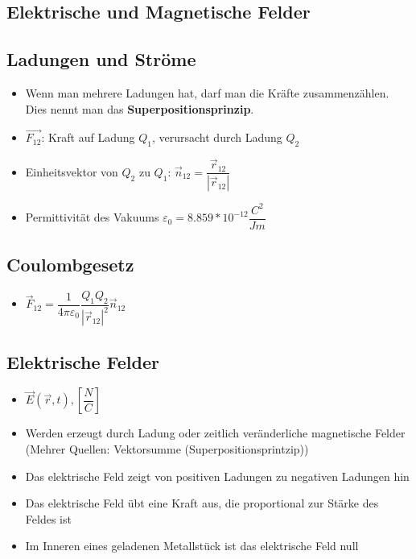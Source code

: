 \documentclass[8pt,a4paper]{scrartcl}
\begin{document}
\begin{multicols*}{3}
		\section{Elektrische und Magnetische Felder}

			\subsection{Ladungen und Ströme}
				\begin{itemize}\itemsep0pt
					\item Wenn man mehrere Ladungen hat, darf man die Kräfte zusammenzählen. Dies nennt man das \textbf{Superpositionsprinzip}.
					\item $\overrightarrow{F_{12}}$: Kraft auf Ladung $Q_{1}$, verursacht durch Ladung $Q_{2}$
					\item Einheitsvektor von $Q_{2}$ zu $Q_{1}$: $\overrightarrow{n}_{12} = \dfrac{\overrightarrow{r}_{12}}{|\overrightarrow{r}_{12}|}$
					\item Permittivität des Vakuums $ \varepsilon_{0}=8.859*10^{-12}\dfrac{C^{2}}{Jm}$
				\end{itemize}
			
			
			
			
			
			\subsection{Coulombgesetz}
				\begin{itemize}\itemsep0pt
					\item $\overrightarrow{F}_{12}=\dfrac{1}{4\pi\varepsilon_{0}}\dfrac{Q_{1}Q_{2}}{|\overrightarrow{r}_{12}|^{2}}\overrightarrow{n}_{12}$
				\end{itemize}
			
			\subsection{Elektrische Felder}
			
				\begin{itemize}\itemsep0pt
					\item $\overrightarrow{E}(\overrightarrow{r},t), [\dfrac{N}{C}]$
					\item Werden erzeugt durch Ladung oder zeitlich veränderliche magnetische Felder (Mehrer Quellen: Vektorsumme (Superpositionsprintzip))
					\item Das elektrische Feld zeigt von positiven Ladungen zu negativen Ladungen hin
					\item Das elektrische Feld übt eine Kraft aus, die proportional zur Stärke des Feldes ist
					\item Im Inneren eines geladenen Metallstück ist das elektrische Feld null
				\end{itemize}
			

\end{multicols*}
\end{document}
